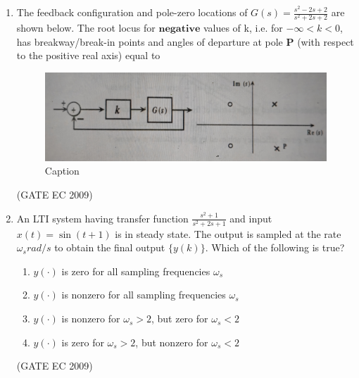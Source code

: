 \documentclass[journal,12pt,onecolumn]{IEEEtran}
\theoremstyle{remark}
\begin{document}
\begin{enumerate}[start=1, label={Q\arabic*.}]
\item The feedback configuration and pole-zero locations of $G(s) = \frac{s^2 -2s +2}{s^2 +2s +2}$ are shown below. The root locus for $\textbf{negative}$ values of k, i.e. for $-\infty < k<0$, has breakway/break-in points and angles of departure at pole $\textbf{P}$ (with respect to the positive real axis) equal to 
\begin{figure}[H]
    \centering
    \includegraphics[width=0.5\linewidth]{images/img_19.jpg}
    \caption{Caption}
    \label{fig:placeholder}
\end{figure}
\begin{enumerate}[label=(\Alph*)]
\end{enumerate}
\hfill (GATE EC 2009)


\item An LTI system having transfer function $\frac{s^2+1}{s^2 +2s +1}$ and input $x(t) = \sin(t+1)$ is in steady state. The output is sampled at the rate $\omega_s rad/s$ to obtain the final output $\{ y(k)\}$. Which of the following is true?
\begin{enumerate}[label=(\Alph*)]
        \item $y(\cdot)$ is zero for all sampling frequencies $\omega_s$
        \item $y(\cdot)$ is nonzero for all sampling frequencies $\omega_s$
        \item $y(\cdot)$ is nonzero for $\omega_s>2$, but zero for $\omega_s<2$
        \item $y(\cdot)$ is zero for $\omega_s>2$, but nonzero for $\omega_s<2$
\end{enumerate}
\hfill (GATE EC 2009)


\end{enumerate}
\end{document}
